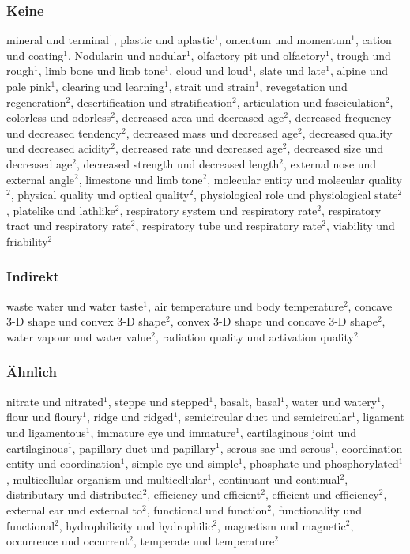 \subsubsection{Keine}
mineral und terminal$^1$, plastic und aplastic$^1$, omentum und momentum$^1$, cation und
coating$^1$, Nodularin und nodular$^1$, olfactory pit und olfactory$^1$, trough und
rough$^1$, limb bone und limb tone$^1$, cloud und loud$^1$, slate und late$^1$, alpine und
pale pink$^1$, clearing und learning$^1$, strait und strain$^1$, revegetation und
regeneration$^2$, desertification und stratification$^2$, articulation und
fasciculation$^2$, colorless und odorless$^2$, decreased area und decreased age$^2$,
decreased frequency und decreased tendency$^2$, decreased mass und decreased age$^2$,
decreased quality und decreased acidity$^2$, decreased rate und decreased age$^2$,
decreased size und decreased age$^2$, decreased strength und decreased length$^2$,
external nose und external angle$^2$, limestone und limb tone$^2$, molecular entity und
molecular quality$^2$, physical quality und optical quality$^2$, physiological
role und physiological state$^2$, platelike und lathlike$^2$, respiratory system und
respiratory rate$^2$, respiratory tract und respiratory rate$^2$, respiratory tube und
respiratory rate$^2$, viability und friability$^2$\\

\subsubsection{Indirekt}
waste water und water taste$^1$, air temperature und body temperature$^2$, concave 3-D
shape und convex 3-D shape$^2$, convex 3-D shape und concave 3-D shape$^2$, water
vapour und water value$^2$, radiation quality und activation quality$^2$

\subsubsection{Ähnlich}
nitrate und nitrated$^1$, steppe und stepped$^1$, basalt, basal$^1$, water und
watery$^1$, flour und floury$^1$, ridge und ridged$^1$, semicircular duct und
semicircular$^1$, ligament und ligamentous$^1$, immature eye und immature$^1$,
cartilaginous joint und cartilaginous$^1$, papillary duct und papillary$^1$, serous
sac und serous$^1$, coordination entity und coordination$^1$, simple eye und simple$^1$,
phosphate und phosphorylated$^1$, multicellular organism und multicellular$^1$,
continuant und continual$^2$, distributary und distributed$^2$, efficiency und
efficient$^2$, efficient und efficiency$^2$, external ear und external to$^2$,
functional und function$^2$, functionality und functional$^2$, hydrophilicity und
hydrophilic$^2$, magnetism und magnetic$^2$, occurrence und occurrent$^2$, temperate und
temperature$^2$

